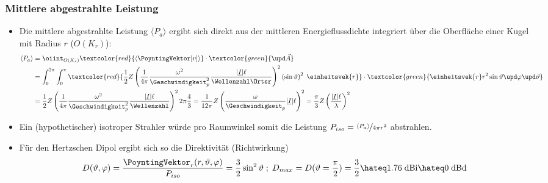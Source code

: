 \begin{frame}
  \frametitle{Mittlere abgestrahlte Leistung}
  \begin{itemize}[<+->]
  \item Die mittlere abgestrahlte Leistung \(\langle P_a \rangle\) ergibt sich direkt aus der mittleren Energieflussdichte integriert über die Oberfläche einer Kugel mit Radius \(r\) (\(O(K_r)\)):
    \begin{align*}
      \langle P_a \rangle &= \oiint_{O(K_r)} \textcolor{red}{\langle \PoyntingVektor[v] \rangle} \cdot \textcolor{green}{\upd\vec{A}} \\
      &= \int_0^{2\pi}\int_0^\pi \textcolor{red}{\frac{1}{2} Z \left( \frac{1}{4\pi} \frac{\omega^2}{\Geschwindigkeit_p^2}\frac{|\underline{I}| \ell}{\Wellenzahl\Ortsr} \right)^2 \left(\sin\vartheta\right)^2 \; \einheitsvek{r}} \cdot \textcolor{green}{\einheitsvek{r} r^2\sin\vartheta \upd\varphi\upd\vartheta}  \\
      &= \frac{1}{2} Z \left( \frac{1}{4\pi} \frac{\omega^2}{\Geschwindigkeit_p^2}\frac{|\underline{I}| \ell}{\Wellenzahl} \right)^2 2\pi \frac{4}{3} = \frac{1}{12\pi} Z \left( \frac{\omega}{\Geschwindigkeit_p}|\underline{I}| \ell \right)^2 = \frac{\pi}{3} Z \left( \frac{|\underline{I}| \ell}{\lambda} \right)^2 
    \end{align*}
  \item Ein (hypothetischer) \alert{isotroper Strahler} würde pro Raumwinkel somit die Leistung \(P_{iso}= \nicefrac{\langle P_a \rangle}{4\pi r^2} \) abstrahlen.
  \item Für den Hertzschen Dipol ergibt sich so die \alert{Direktivität} (Richtwirkung)
    \begin{equation*}
      D(\vartheta,\varphi) = \frac{\PoyntingVektor_r(r,\vartheta, \varphi)}{P_{iso}} = \frac{3}{2} \sin^2\vartheta \; ; \; D_{max} = D(\vartheta=\frac{\pi}{2}) = \frac{3}{2} \hateq 1.76\; \text{dBi} \hateq 0\; \text{dBd}  
      \end{equation*}
 \end{itemize}
  \end{frame}

